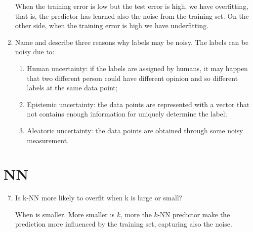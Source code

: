 \documentclass[a4paper]{article}
\begin{document}
\begin{enumerate}
        When the training error is low but the test error is high, we have overfitting, that is, the
        predictor has learned also the noise from the training set. On the other side, when
        the training error is high we have underfitting.
    \item Name and describe three reasons why labels may be noisy.
        The labels can be noisy due to:
        \begin{enumerate}
            \item Human uncertainty: if the labels are assigned by humans, it may happen that
                two different person could have different opinion and so different labels at the
                same data point;
            \item Epistemic uncertainty: the data points are represented with a vector that not
                contains enough information for uniquely determine the label;
            \item Aleatoric uncertainty: the data points are obtained through some noisy measurement.
        \end{enumerate}
\end{enumerate}

\section{NN}
\begin{enumerate}
    \setcounter{enumi}{6}
    \item Is k-NN more likely to overfit when k is large or small?

        When is smaller. More smaller is $k$, more the $k$-NN predictor make the prediction more
        influenced by the training set, capturing also the noise.
\end{enumerate}
\end{document}
